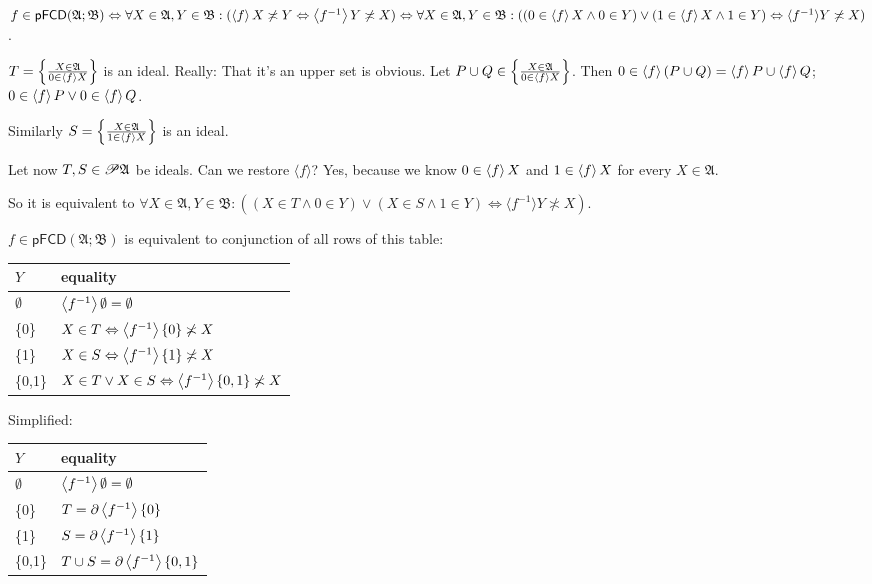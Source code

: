 $f \in \mathsf{pFCD} (\mathfrak{A}; \mathfrak{B}) \Leftrightarrow \forall X \in
\mathfrak{A}, Y \in \mathfrak{B}: (\left\langle f\right\rangle X \not\asymp Y
\Leftrightarrow \left\langle f^{- 1}\right\rangle Y \not\asymp X) \Leftrightarrow \forall X
\in \mathfrak{A}, Y \in \mathfrak{B}: ((0 \in \left\langle f\right\rangle X \wedge 0 \in
Y) \vee (1 \in \left\langle f\right\rangle X \wedge 1 \in Y) \Leftrightarrow \langle
f^{- 1} \rangle Y \not\asymp X)$.

$T = \left\{ \frac{ X \in \mathfrak{A} }{ 0 \in \langle f
\rangle X }\right\}$ is an ideal. Really: That it's an upper set is obvious.
Let $P \cup Q \in \left\{ \frac{ X \in \mathfrak{A} }{ 0 \in
\left\langle f\right\rangle X }\right\}$. Then $0 \in \left\langle f\right\rangle (P \cup Q) =
\left\langle f\right\rangle P \cup \left\langle f\right\rangle Q$; $0 \in \left\langle f\right\rangle P \vee
0 \in \left\langle f\right\rangle Q$.

Similarly $S = \left\{ \frac{ X \in \mathfrak{A} }{ 1 \in
\left\langle f\right\rangle X }\right\}$ is an ideal.

Let now $T, S \in \mathscr{P} \mathfrak{A}$ be ideals. Can we restore $\langle
f \rangle$? Yes, because we know $0 \in \left\langle f\right\rangle X$ and $1 \in
\left\langle f\right\rangle X$ for every $X \in \mathfrak{A}$.

So it is equivalent to $\forall X \in \mathfrak{A}, Y \in \mathfrak{B}: ((X
\in T \wedge 0 \in Y) \vee (X \in S \wedge 1 \in Y) \Leftrightarrow \langle
f^{- 1} \rangle Y \nasymp X)$.

$f \in \mathsf{pFCD} (\mathfrak{A}; \mathfrak{B})$ is equivalent to conjunction
of all rows of this table:

\begin{tabular}{|l|l|}
  \hline
  $Y$ & equality \\ \hline\hline
  $\emptyset$ & $\left\langle f^{- 1}\right\rangle \emptyset = \emptyset$\\
  \{0\} & $X \in T \Leftrightarrow \left\langle f^{- 1}\right\rangle \{ 0 \} \not\asymp
  X$\\ \hline
  \{1\} & $X \in S \Leftrightarrow \left\langle f^{- 1}\right\rangle \{ 1 \} \not\asymp
  X$\\ \hline
  \{0,1\} & $X \in T \vee X \in S \Leftrightarrow \left\langle f^{- 1}\right\rangle \{
  0, 1 \} \not\asymp X$ \\
  \hline
\end{tabular}

Simplified:

\begin{tabular}{|l|l|}
  \hline
  $Y$ & equality \\ \hline\hline
  $\emptyset$ & $\left\langle f^{- 1}\right\rangle \emptyset = \emptyset$\\ \hline
  \{0\} & $T = \partial \left\langle f^{- 1}\right\rangle \{ 0 \}$\\ \hline
  \{1\} & $S = \partial \left\langle f^{- 1}\right\rangle \{ 1 \}$\\ \hline
  \{0,1\} & $T \cup S = \partial \left\langle f^{- 1}\right\rangle \{ 0, 1 \}$ \\
  \hline
\end{tabular}

